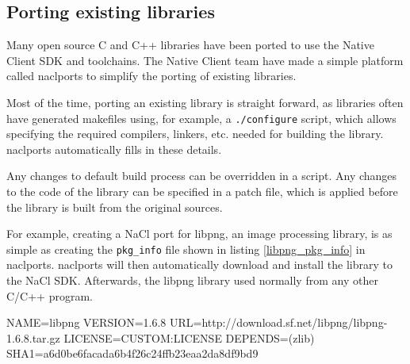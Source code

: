 
\subsection{Porting existing libraries} %
\label{sub:naclports}
Many open source C and C++ libraries have been ported to use the Native Client SDK and toolchains. The Native Client team have made a simple platform called naclports to simplify the porting of existing libraries. 

Most of the time, porting an existing library is straight forward, as libraries often have generated makefiles using, for example, a \lstinline+./configure+ script, which allows specifying the required compilers, linkers, etc. needed for building the library. naclports automatically fills in these details. 

Any changes to default build process can be overridden in a script. Any changes to the code of the library can be specified in a patch file, which is applied before the library is built from the original sources.

For example, creating a NaCl port for libpng, an image processing library, is as simple as creating the \lstinline+pkg_info+ file shown in listing \ref{libpng_pkg_info} in naclports. naclports will then automatically download and install the library to the NaCl SDK. Afterwards, the libpng library used normally from any other C/C++ program.

\begin{code}
NAME=libpng
VERSION=1.6.8
URL=http://download.sf.net/libpng/libpng-1.6.8.tar.gz
LICENSE=CUSTOM:LICENSE
DEPENDS=(zlib)
SHA1=a6d0be6facada6b4f26c24ffb23eaa2da8df9bd9
\end{code}




